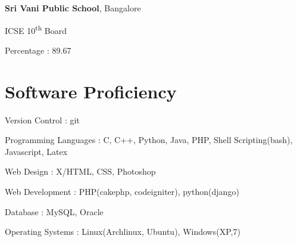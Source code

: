 \begin{resume}
{\bf \textsf{Sri Vani Public School}}, Bangalore\\
\vspace*{-.1in}
\begin{list1}
\item[] ICSE 10\textsuperscript{th} Board \qquad
\begin{list2}
\item  Percentage : 89.67
\end{list2}
\end{list1}






\section{\sc Software Proficiency}
\begin{list2}
 \item Version Control : git
 \item Programming Languages : C, C++, Python, Java, PHP, Shell Scripting(bash), Javascript, Latex
 \item Web Design : X/HTML, CSS, Photoshop
 \item Web Development : PHP(cakephp, codeigniter), python(django) 
 \item Database : MySQL, Oracle
 \item Operating Systems : Linux(Archlinux, Ubuntu), Windows(XP,7)
 \end{list2}



\end{resume}
